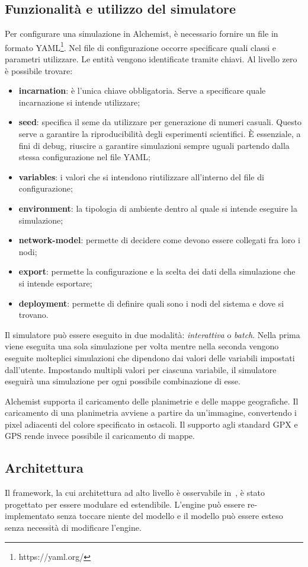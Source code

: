 \documentclass[12pt,a4paper,openright,twoside]{book}
\begin{document}
\subsection{Funzionalità e utilizzo del simulatore}
Per configurare una simulazione in Alchemist, è necessario fornire un file in formato YAML\footnote{https://yaml.org/}. Nel file di configurazione occorre specificare quali classi e parametri utilizzare. Le entità vengono identificate tramite chiavi. Al livello zero è possibile trovare: 
\begin{itemize}
    \item \textbf{incarnation}: è l'unica chiave obbligatoria. Serve a specificare quale incarnazione si intende utilizzare; 
    \item \textbf{seed}: specifica il seme da utilizzare per generazione di numeri casuali. Questo serve a garantire la riproducibilità degli esperimenti scientifici. È essenziale, a fini di debug, riuscire a garantire simulazioni sempre uguali partendo dalla stessa configurazione nel file YAML;
    \item \textbf{variables}: i valori che si intendono riutilizzare all'interno del file di configurazione;
    \item \textbf{environment}: la tipologia di ambiente dentro al quale si intende eseguire la simulazione;
    \item \textbf{network-model}: permette di decidere come devono essere collegati fra loro i nodi;
    \item \textbf{export}: permette la configurazione e la scelta dei dati della simulazione che si intende esportare; 
    \item \textbf{deployment}: permette di definire quali sono i nodi del sistema e dove si trovano. 
\end{itemize}
Il simulatore può essere eseguito in due modalità: \textit{interattiva} o \textit{batch}. Nella prima viene eseguita una sola simulazione per volta mentre nella seconda vengono eseguite molteplici simulazioni che dipendono dai valori delle variabili impostati dall'utente. Impostando multipli valori per ciascuna variabile, il simulatore eseguirà una simulazione per ogni possibile combinazione di esse. 

Alchemist supporta il caricamento delle planimetrie e delle mappe geografiche. Il caricamento di una planimetria avviene a partire da un'immagine, convertendo i pixel adiacenti del colore specificato in ostacoli. Il supporto agli standard GPX e GPS rende invece possibile il caricamento di mappe. 
\subsection{Architettura}
Il framework, la cui architettura ad alto livello è osservabile in~, è stato progettato per essere modulare ed estendibile. L'engine può essere re-implementato senza toccare niente del modello e il modello può essere esteso senza necessità di modificare l'engine. 
\end{document}
